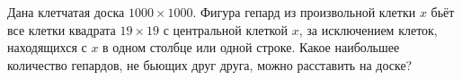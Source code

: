 Дана клетчатая доска $1000 \times 1000$. Фигура гепард из произвольной клетки $x$ бьёт все клетки квадрата $19 \times 19$ с центральной клеткой $x$, за исключением клеток, находящихся с $x$ в одном столбце или одной строке. Какое наибольшее количество гепардов, не бьющих друг друга, можно расставить на доске?